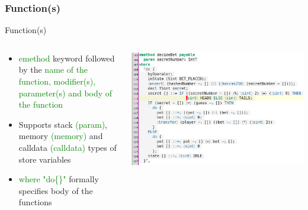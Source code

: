 \documentclass[aspectratio=169]{beamer}
\begin{document}
\subsubsection{Function(s)}
\begin{frame}{Function(s)}
\begin{columns}
\begin{column}{0.40\textwidth}
  \begin{itemize}
\item \textcolor{green}{emethod} keyword followed by the \textcolor{green}{name of the function, modifier(s), parameter(s) and body of the function}
\item Supports stack \textcolor{green}{(param)}, memory \textcolor{green}{(memory)} and calldata \textcolor{green}{(calldata)} types of store  variables
\item \textcolor{green}{where "do\{\}"} formally specifies body of the functions  

\end{itemize}
\end{column}
\begin{column}{0.60\textwidth}  %
    \begin{center}
     \includegraphics[width=\textwidth]{method_contract.png}
     \end{center}
\end{column}
\end{columns}
%
%
\end{frame}
\end{document}
